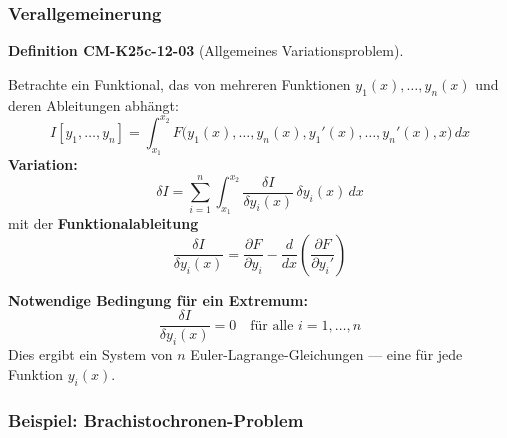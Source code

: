 \documentclass[10pt, letterpaper]{article}
\newcommand{\CustomHeading}[3]{%
  \par\medskip\noindent%
  \textbf{#1 #2} \textnormal{(#3)}.\enskip%
}
\newenvironment{DEF}[2]{\begin{unitbox}\CustomHeading{Definition}{#1}{#2}}{\end{unitbox}}
\begin{document}
\subsubsection{Verallgemeinerung}

\begin{DEF}{CM-K25c-12-03}{Allgemeines Variationsproblem}
Betrachte ein Funktional, das von mehreren Funktionen \( y_1(x), \dots, y_n(x) \) und deren Ableitungen abhängt:
\[
I[y_1,\dots,y_n] = \int_{x_1}^{x_2} F\big(y_1(x),\dots,y_n(x),y_1'(x),\dots,y_n'(x),x\big)\, dx
\]
\textbf{Variation:}
\[
\delta I = \sum_{i=1}^n \int_{x_1}^{x_2} \frac{\delta I}{\delta y_i(x)}\, \delta y_i(x)\, dx
\]
mit der \textbf{Funktionalableitung}
\[
\frac{\delta I}{\delta y_i(x)} = \frac{\partial F}{\partial y_i} - \frac{d}{dx} \left( \frac{\partial F}{\partial y_i'} \right)
\]

\vspace{0.5em}
\textbf{Notwendige Bedingung für ein Extremum:}
\[
\boxed{
\frac{\delta I}{\delta y_i(x)} = 0 \quad \text{für alle } i = 1,\dots,n
}
\]
Dies ergibt ein System von \( n \) Euler-Lagrange-Gleichungen — eine für jede Funktion \( y_i(x) \).
\end{DEF}





\subsubsection{Beispiel: Brachistochronen-Problem} 
\end{document}

